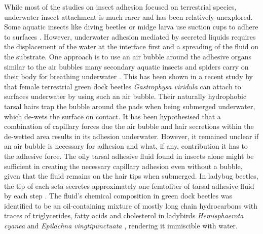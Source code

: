 \documentclass[vruler,JEB]{COB}%
\begin{document}
While most of the studies on insect adhesion focused on terrestrial species, underwater insect attachment is much rarer and has been relatively unexplored. Some aquatic insects like diving beetles \citep{Chen:2014} or midge larva \citep{Kang:2020} use suction cups to adhere to surfaces \citep{DITSCHEKURU2012379,RN123}. However, underwater adhesion mediated by secreted liquids requires the displacement of the water at the interface first and a spreading of the fluid on the substrate. One approach is to use an air bubble around the adhesive organs similar to the air bubbles many secondary aquatic insects and spiders carry on their body for breathing underwater \citep{Seymour:2013}. This has been shown in a recent study by \citet{RN87} that female terrestrial green dock beetles \emph{Gastrophysa viridula} can attach to surfaces underwater by using such an air bubble. Their naturally hydrophobic tarsal hairs trap the bubble around the pads when being submerged underwater, which de-wets the surface on contact. It has been hypothesised that a combination of capillary forces due the air bubble and hair secretions within the de-wetted area results in its adhesion underwater. However, it remained unclear if an air bubble is necessary for adhesion and what, if any, contribution it has to the adhesive force. The oily tarsal adhesive fluid found in insects alone might be sufficient in creating the necessary capillary adhesion even without a bubble, given that the fluid remains on the hair tips when submerged. In ladybug beetles, the tip of each seta secretes approximately one femtoliter of tarsal adhesive fluid by each step \citep{RN108}. The fluid's chemical composition in green dock beetles was identified to be an oil-containing mixture of mostly long chain hydrocarbons\citep{RN96} with traces
of triglycerides, fatty acids and cholesterol in ladybirds \emph{Hemisphaerota cyanea} \citep{RN221} and \emph{Epilachna vingtipunctuata} \citep{RN222}, rendering it immiscible with water.
\end{document}
